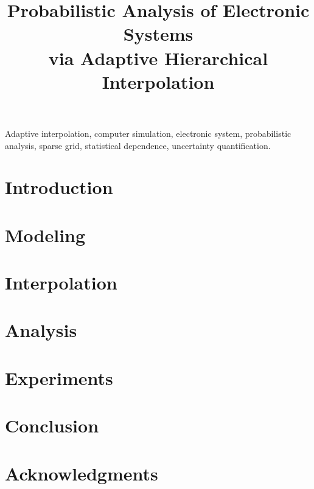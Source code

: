 \documentclass[journal]{IEEEtran}
\title{
  Probabilistic Analysis of Electronic Systems\\
  via Adaptive Hierarchical Interpolation
}
\author{}
\begin{document}
  \maketitle

  \begin{abstract}
    
  \end{abstract}

  \begin{IEEEkeywords}
    Adaptive interpolation,
    computer simulation,
    electronic system,
    probabilistic analysis,
    sparse grid,
    statistical dependence,
    uncertainty quantification.
  \end{IEEEkeywords}


  \section{Introduction} 
  

  \section{} 
  

  \section{} 
  

  \section{Modeling} 
  

  \section{Interpolation} 
  

  \section{Analysis} 
  

  \section{Experiments} 
  

  \section{Conclusion} 
  

  \section*{Acknowledgments}
  

  \linespread{0.95}
  \begingroup
    
    
  \endgroup
\end{document}
